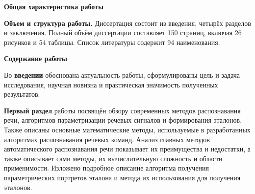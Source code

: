 \begin{center}
{\fontsize{11}{13}\selectfont \textbf{Общая характеристика работы}}
\end{center}

\newcommand{\actuality}{\underline{\textbf{\actualityTXT}}}
\newcommand{\progress}{\underline{\textbf{\progressTXT}}}
\newcommand{\aim}{\underline{{\textbf\aimTXT}}}
\newcommand{\tasks}{\underline{\textbf{\tasksTXT}}}
\newcommand{\novelty}{\underline{\textbf{\noveltyTXT}}}
\newcommand{\influence}{\underline{\textbf{\influenceTXT}}}
\newcommand{\methods}{\underline{\textbf{\methodsTXT}}}
\newcommand{\defpositions}{\underline{\textbf{\defpositionsTXT}}}
\newcommand{\reliability}{\underline{\textbf{\reliabilityTXT}}}
\newcommand{\probation}{\underline{\textbf{\probationTXT}}}
\newcommand{\contribution}{\underline{\textbf{\contributionTXT}}}
\newcommand{\publications}{\underline{\textbf{\publicationsTXT}}}



\textbf{Объем и структура работы.} Диссертация состоит из введения, четырёх разделов и заключения. Полный объём диссертации составляет 150 страниц, включая 26 рисунков и 54 таблицы. Список литературы содержит 94 наименования.

\newpage
\begin{center}
	{\fontsize{11}{13}\selectfont \textbf{Содержание работы} \vspace{-1.5ex}}
\end{center}

Во \textbf{введении} обоснована актуальность работы, сформулированы цель и задача исследования, научная новизна и практическая значимость полученных результатов.

\textbf{Первый раздел} работы посвящён обзору современных методов распознавания речи, алгоритмов параметризации речевых сигналов и формирования эталонов.
Также описаны основные математические методы, используемые в разработанных алгоритмах распознавания речевых команд.
Анализ главных методов автоматического распознавания речи показывает их преимущества и недостатки, а также описывает сами методы, их вычислительную сложность и области применимости.
Изложено подробное описание алгоритма получения параметрических портретов эталона и метода их использования для получения эталонов.

